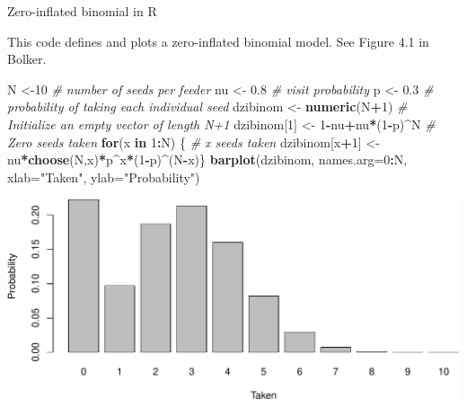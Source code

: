 \documentclass[
  ignorenonframetext,
]{beamer}
\newenvironment{Shaded}{\begin{snugshade}}{\end{snugshade}}
\newcommand{\CommentTok}[1]{\textcolor[rgb]{0.56,0.35,0.01}{\textit{#1}}}
\newcommand{\ControlFlowTok}[1]{\textcolor[rgb]{0.13,0.29,0.53}{\textbf{#1}}}
\newcommand{\DataTypeTok}[1]{\textcolor[rgb]{0.13,0.29,0.53}{#1}}
\newcommand{\DecValTok}[1]{\textcolor[rgb]{0.00,0.00,0.81}{#1}}
\newcommand{\FloatTok}[1]{\textcolor[rgb]{0.00,0.00,0.81}{#1}}
\newcommand{\KeywordTok}[1]{\textcolor[rgb]{0.13,0.29,0.53}{\textbf{#1}}}
\newcommand{\NormalTok}[1]{#1}
\newcommand{\OperatorTok}[1]{\textcolor[rgb]{0.81,0.36,0.00}{\textbf{#1}}}
\newcommand{\StringTok}[1]{\textcolor[rgb]{0.31,0.60,0.02}{#1}}
\begin{document}
\begin{frame}[fragile]{Zero-inflated binomial in R}
\protect\hypertarget{zero-inflated-binomial-in-r}{}

This code defines and plots a zero-inflated binomial model. See Figure
4.1 in Bolker. \scriptsize

\begin{Shaded}
\begin{Highlighting}[]
\NormalTok{N <-}\DecValTok{10} \CommentTok{# number of seeds per feeder}
\NormalTok{nu <-}\StringTok{ }\FloatTok{0.8} \CommentTok{# visit probability}
\NormalTok{p <-}\StringTok{ }\FloatTok{0.3} \CommentTok{# probability of taking each individual seed}
\NormalTok{dzibinom <-}\StringTok{ }\KeywordTok{numeric}\NormalTok{(N}\OperatorTok{+}\DecValTok{1}\NormalTok{) }\CommentTok{# Initialize an empty vector of length N+1}
\NormalTok{dzibinom[}\DecValTok{1}\NormalTok{] <-}\StringTok{ }\DecValTok{1}\OperatorTok{-}\NormalTok{nu}\OperatorTok{+}\NormalTok{nu}\OperatorTok{*}\NormalTok{(}\DecValTok{1}\OperatorTok{-}\NormalTok{p)}\OperatorTok{^}\NormalTok{N }\CommentTok{# Zero seeds taken}
\ControlFlowTok{for}\NormalTok{(x }\ControlFlowTok{in} \DecValTok{1}\OperatorTok{:}\NormalTok{N) \{ }\CommentTok{# x seeds taken}
\NormalTok{  dzibinom[x}\OperatorTok{+}\DecValTok{1}\NormalTok{] <-nu}\OperatorTok{*}\KeywordTok{choose}\NormalTok{(N,x)}\OperatorTok{*}\NormalTok{p}\OperatorTok{^}\NormalTok{x}\OperatorTok{*}\NormalTok{(}\DecValTok{1}\OperatorTok{-}\NormalTok{p)}\OperatorTok{^}\NormalTok{(N}\OperatorTok{-}\NormalTok{x)\}}
\KeywordTok{barplot}\NormalTok{(dzibinom, }\DataTypeTok{names.arg=}\DecValTok{0}\OperatorTok{:}\NormalTok{N, }\DataTypeTok{xlab=}\StringTok{"Taken"}\NormalTok{, }\DataTypeTok{ylab=}\StringTok{"Probability"}\NormalTok{)}
\end{Highlighting}
\end{Shaded}

\includegraphics{noise_files/figure-beamer/unnamed-chunk-3-1.pdf}

\end{frame}
\end{document}
